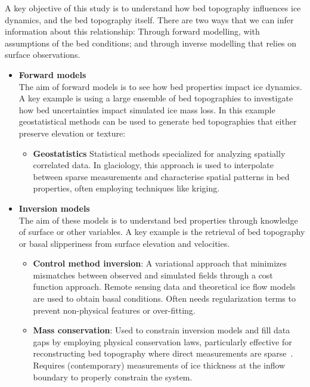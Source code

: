 A key objective of this study is to understand how bed topography influences ice dynamics, and the bed topography itself. There are two ways that we can infer information about this relationship: Through forward modelling, with assumptions of the bed conditions; and through inverse modelling that relies on surface observations.
\begin{itemize}
    \item\textbf{Forward models}\\
    The aim of forward models is to see how bed properties impact ice dynamics. A key example is using a large ensemble of bed topographies to investigate how bed uncertainties impact simulated ice mass loss. In this example geostatistical methods can be used to generate bed topographies that either preserve elevation or texture:    
    \begin{itemize}
            \item\textbf{Geostatistics} Statistical methods specialized for analyzing spatially correlated data. In glaciology, this approach is used to interpolate between sparse measurements and characterise spatial patterns in bed properties, often employing techniques like kriging\cite{Mackie_2020}.

    \end{itemize}

    \item\textbf{Inversion models}\\
    The aim of these models is to understand bed properties through knowledge of surface or other variables. A key example is the retrieval of bed topography or basal slipperiness from surface elevation and velocities.

        \begin{itemize}
            \item\textbf{Control method inversion}: A variational approach that minimizes mismatches between observed and simulated fields through a cost function approach. Remote sensing data and theoretical ice flow models are used to obtain basal conditions\cite{deRydt_2013}. Often needs regularization terms to prevent non-physical features or over-fitting\cite{Morlighem_Goldberg_2024}.

            \item\textbf{Mass conservation}: Used to constrain inversion models and fill data gaps by employing physical conservation laws, particularly effective for reconstructing bed topography where direct measurements are sparse~\cite{Morlighem_2017, Morlighem_2020}. Requires (contemporary) measurements of ice thickness at the inflow boundary to properly constrain the system\cite{Morlighem_Goldberg_2024}.


\end{itemize}
\end{itemize}

